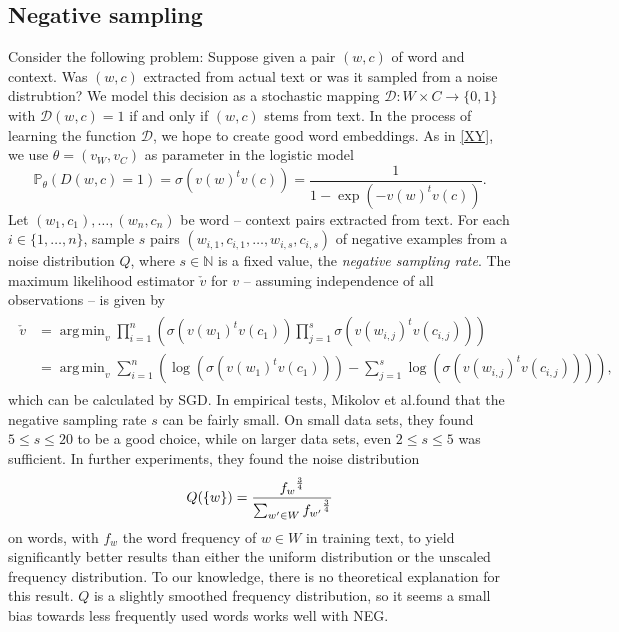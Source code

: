 \documentclass{amsart}
\theoremstyle{plain}
\theoremstyle{definition}
\newcommand{\N}{\mathbb{N}}
\renewcommand{\P}{\mathbb{P}}
\DeclareMathOperator*{\argmin}{arg\,min}
\begin{document}
\subsection{Negative sampling}
Consider the following problem:
Suppose given a pair $(w, c)$ of word and context.
Was $(w, c)$ extracted from actual text or was it sampled from a noise distrubtion?
We model this decision as a stochastic mapping $\mathcal{D} : W \times C \rightarrow \{0, 1\}$ with $\mathcal{D}(w, c) = 1$ if and only if $(w, c)$ stems from text.
In the process of learning the function $\mathcal{D}$, we hope to create good word embeddings.
As in \ref{XY}, we use $\theta = (v_W, v_C)$ as parameter in the logistic model
\begin{equation}
  \P_\theta(D(w, c) = 1) = \sigma(v(w)^t v(c)) = \frac{1}{1 - \exp(-v(w)^t v(c))}.
\end{equation}
Let $(w_1, c_1), \dots, (w_n, c_n)$ be word -- context pairs extracted from text.
For each $i \in \{1, \dots, n\}$, sample $s$ pairs $(w_{i, 1}, c_{i, 1}, \dots, w_{i, s}, c_{i, s})$ of negative examples from a noise distribution $Q$, where $s \in \N$ is a fixed value, the \emph{negative sampling rate}.
The maximum likelihood estimator $\check v$ for $v$ -- assuming independence of all observations -- is given by
\begin{align}
  \label{eq:ns-estimator}
  \begin{split}
    \check v & = \argmin_v \prod_{i=1}^n \left( \sigma(v(w_1)^t v(c_1)) \prod_{j = 1}^s \sigma(v(w_{i, j})^t v(c_{i, j})) \right) \\
             & = \argmin_v \sum_{i=1}^n \left( \log \left(\sigma(v(w_1)^t v(c_1)) \right) - \sum_{j = 1}^s \log \left( \sigma(v(w_{i, j})^t v(c_{i, j})) \right) \right),
  \end{split}
\end{align}
which can be calculated by SGD.
In empirical tests, Mikolov et al.\@ found that the negative sampling rate $s$ can be fairly small.
On small data sets, they found $5 \leq s \leq 20$ to be a good choice, while on larger data sets, even $2 \leq s \leq 5$ was sufficient.
In further experiments, they found the noise distribution
\begin{equation}
  \label{eq:noise-distribution}
  Q(\{w\}) = \frac{{f_w}^{3 \over 4}}{\sum_{w' \in W} {f_{w'}}^{3 \over 4}}
\end{equation}
on words, with $f_w$ the word frequency of $w \in W$ in training text, to yield significantly better results than either the uniform distribution or the unscaled frequency distribution.
To our knowledge, there is no theoretical explanation for this result.
$Q$ is a slightly smoothed frequency distribution, so it seems a small bias towards less frequently used words works well with NEG.
\end{document}
